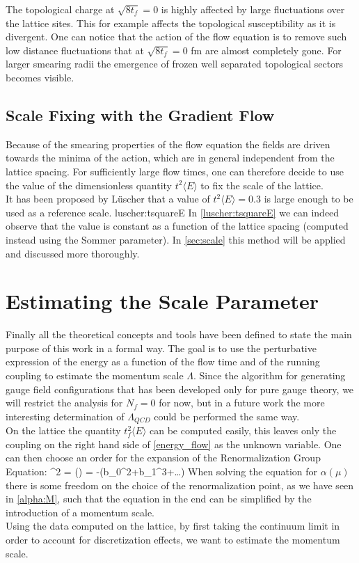 The topological charge at $\sqrt{8t_f} = 0$ is highly affected by large fluctuations over the lattice sites. This for example affects the topological susceptibility as it is divergent. One can notice that the action of the flow equation is to remove such low distance fluctuations that at $\sqrt{8t_f} = 0$ fm are almost completely gone. For larger smearing radii the emergence of frozen well separated topological sectors becomes visible.

\subsection{Scale Fixing with the Gradient Flow}
\label{sec:scale_fixing}
Because of the smearing properties of the flow equation the fields are driven towards the minima of the action, which are in general independent from the lattice spacing. For sufficiently large flow times, one can therefore decide to use the value of the dimensionless quantity $t^2\langle E\rangle$ to fix the scale of the lattice. \\
It has been proposed by L{\"u}scher that a value of $t^2\langle E\rangle = 0.3$ is large enough to be used as a reference scale. 
 {luscher:tsquareE}
In \cref{luscher:tsquareE} we can indeed observe that the value is constant as a function of the lattice spacing (computed instead using the Sommer parameter). In \cref{sec:scale} this method will be applied and discussed more thoroughly.

\section{Estimating the Scale Parameter}
Finally all the theoretical concepts and tools have been defined to state the main purpose of this work in a formal way. The goal is to use the perturbative expression of the energy as a function of the flow time and of the running coupling to estimate the momentum scale  $\Lambda$. Since the algorithm for generating gauge field configurations that has been developed only for pure gauge theory, we will restrict the analysis for $N_f = 0$ for now, but in a future work the more interesting determination of $\Lambda_{QCD}$ could be performed the same way. \\
On the lattice the quantity $t_f^2\langle E \rangle$ can be computed easily, this leaves only the coupling on the right hand side of \cref{energy_flow} as the unknown variable. One can then choose an order for the expansion of the Renormalization Group Equation:
\beq
\mu^2  = \beta(\alpha) = -(b_0\alpha^2+b_1\alpha^3+\dots)
\eeq
When solving the equation for $\alpha(\mu)$ there is some freedom on the choice of the renormalization point, as we have seen in \cref{alpha:M}, such that the equation in the end can be simplified by the introduction of a momentum scale.\\
Using the data computed on the lattice, by first taking the continuum limit in order to account for discretization effects, we want to estimate the momentum scale. 

